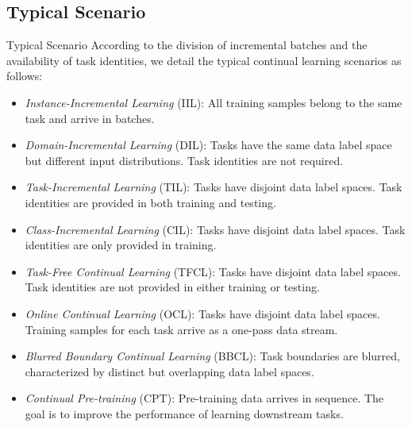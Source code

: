 \documentclass[9pt,dvipsnames]{beamer}
\begin{document}
\subsection{Typical Scenario}
\begin{frame}{Typical Scenario}
    According to the division of incremental batches and the availability of task identities, we detail the typical continual learning scenarios as follows:
    \begin{itemize}
        \item \textit{Instance-Incremental Learning} (IIL): All training samples belong to the same task and arrive in batches.
        \item \textit{Domain-Incremental Learning} (DIL): Tasks have the same data label space but different input distributions. Task identities are not required.
        \item \textit{Task-Incremental Learning} (TIL): Tasks have disjoint data label spaces. Task identities are provided in both training and testing.
        \item \textit{Class-Incremental Learning} (CIL): Tasks have disjoint data label spaces. Task identities are only provided in training.
        \item \textit{Task-Free Continual Learning} (TFCL): Tasks have disjoint data label spaces. Task identities are not provided in either training or testing.
        \item \textit{Online Continual Learning} (OCL): Tasks have disjoint data label spaces. Training samples for each task arrive as a one-pass data stream.
        \item \textit{Blurred Boundary Continual Learning} (BBCL): Task boundaries are blurred, characterized by distinct but overlapping data label spaces.
        \item \textit{Continual Pre-training} (CPT): Pre-training data arrives in sequence. The goal is to improve the performance of learning downstream tasks.
    \end{itemize}
\end{frame}
\end{document}
